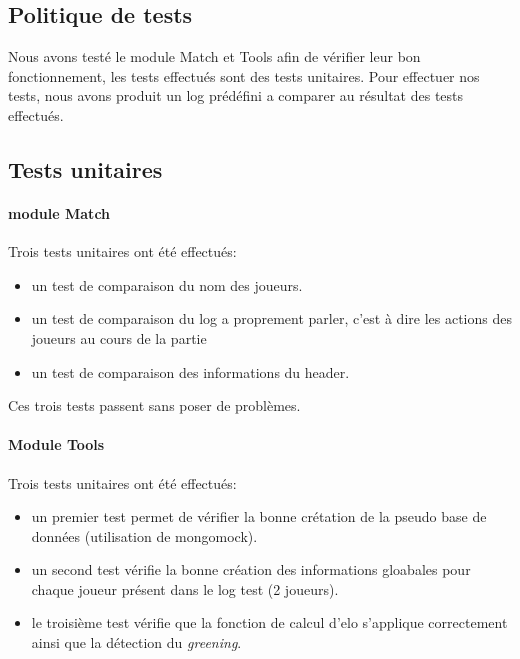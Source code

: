 \subsection{Politique de tests}
Nous avons testé le module Match et Tools afin de vérifier leur bon fonctionnement, les tests effectués sont des tests unitaires. Pour effectuer nos tests, nous avons produit un log prédéfini a comparer au résultat des tests effectués.

\subsection{Tests unitaires}
\paragraph{module Match}
Trois tests unitaires ont été effectués:
\begin{itemize}
\item un test de comparaison du nom des joueurs.
\item un test de comparaison du log a proprement parler, c'est à dire les actions des joueurs au cours de la partie
\item un test de comparaison des informations du header.
\end{itemize}

Ces trois tests passent sans poser de problèmes.

\paragraph{Module Tools}
Trois tests unitaires ont été effectués:
\begin{itemize}
\item un premier test permet de vérifier la bonne crétation de la pseudo base de données (utilisation de mongomock).
\item un second test vérifie la bonne création des informations gloabales pour chaque joueur présent dans le log test (2 joueurs).
\item le troisième test vérifie que la fonction de calcul d'elo s'applique correctement ainsi que la détection du \textit{greening}.
\end{itemize}

